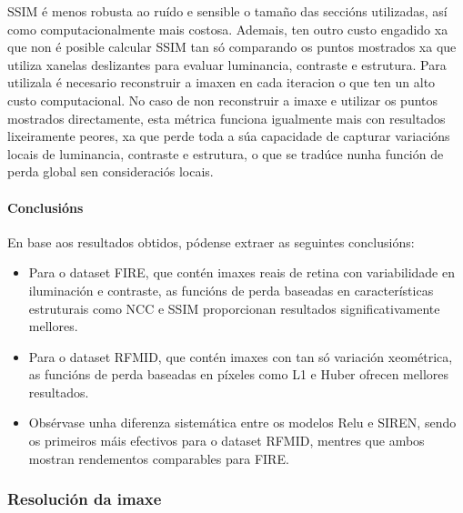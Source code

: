 SSIM é menos robusta ao ruído e sensible o tamaño das seccións utilizadas, así como computacionalmente mais costosa. Ademais, ten outro custo engadido xa que non é posible calcular SSIM tan só comparando os puntos mostrados xa que utiliza xanelas deslizantes para evaluar luminancia, contraste e estrutura. 
Para utilizala é necesario reconstruir a imaxen en cada iteracion o que ten un alto custo computacional.
No caso de non reconstruir a imaxe e utilizar os puntos mostrados directamente, esta métrica funciona igualmente mais con resultados lixeiramente peores, xa que perde toda a súa capacidade de capturar variacións locais de luminancia, contraste e estrutura, o que se tradúce nunha función de perda global sen consideraciós locais.



\paragraph{Conclusións}
\label{par:Conclusions-loss}

En base aos resultados obtidos, pódense extraer as seguintes conclusións:
\begin{itemize}
    \item Para o dataset FIRE, que contén imaxes reais de retina con variabilidade en iluminación e contraste, as funcións de perda baseadas en características estruturais como NCC e SSIM proporcionan resultados significativamente mellores.
    \item Para o dataset RFMID, que contén imaxes con tan só variación xeométrica, as funcións de perda baseadas en píxeles como L1 e Huber ofrecen mellores resultados.
    \item Obsérvase unha diferenza sistemática entre os modelos Relu e SIREN, sendo os primeiros máis efectivos para o dataset RFMID, mentres que ambos mostran rendementos comparables para FIRE.
\end{itemize}


\subsubsection{Resolución da imaxe}
\label{subsubsec:Resolución da imaxe}

